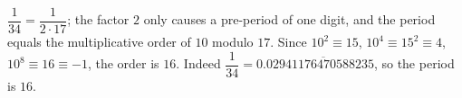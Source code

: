 $\dfrac{1}{34}=\dfrac{1}{2\cdot17}$; the factor $2$ only causes a pre-period of one digit, and the period equals the multiplicative order of $10$ modulo $17$. Since $10^2\equiv15$, $10^4\equiv15^2\equiv4$, $10^8\equiv16\equiv-1$, the order is $16$. Indeed $\dfrac{1}{34}=0.0\overline{2941176470588235}$, so the period is $\boxed{16}$.
